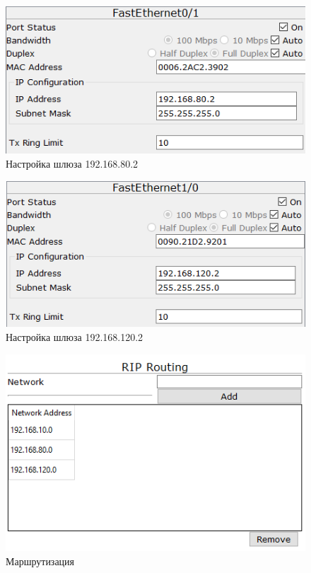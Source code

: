 \begin{figure}[h!]
	\centering
	\includegraphics[scale = 0.65]{images/4_2.png}
	\caption{Настройка шлюза 192.168.80.2}
	\label{image:4_2}
\end{figure}

\begin{figure}[h!]
	\centering
	\includegraphics[scale = 0.65]{images/4_3.png}
	\caption{Настройка шлюза 192.168.120.2}
	\label{image:4_3}
\end{figure}

\begin{figure}[h!]
	\centering
	\includegraphics[scale = 0.65]{images/4_4.png}
	\caption{Маршрутизация}
	\label{image:4_4}
\end{figure}

